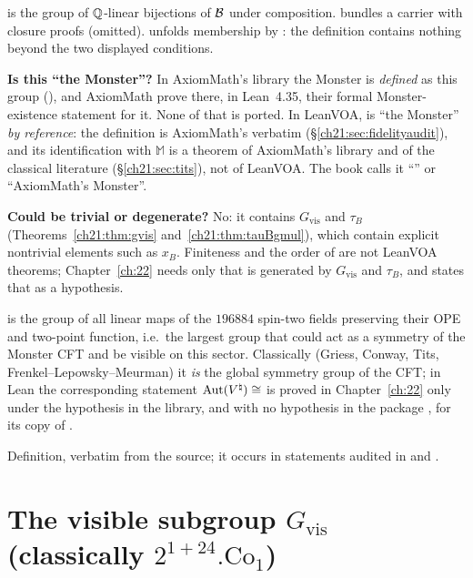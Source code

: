 \begin{dictionary}
 is the group of ${\mathbb{Q}}$-linear bijections of $\mathcal{B}$ under composition.
 bundles a carrier with closure proofs (omitted).   unfolds membership by
: the definition contains nothing beyond the two displayed conditions.

\textbf{Is this ``the Monster''?}  In AxiomMath's library the Monster is \emph{defined} as this group
(), and AxiomMath prove there, in Lean~4.35, their formal
Monster-existence statement for it.  None of that is ported.  In LeanVOA,  is ``the
Monster'' \emph{by reference}: the definition is AxiomMath's verbatim (\S\ref{ch21:sec:fidelityaudit}),
and its identification with $\mathbb M$ is a theorem of AxiomMath's library and of the classical
literature (\S\ref{ch21:sec:tits}), not of LeanVOA.  The book calls it ``'' or ``AxiomMath's
Monster''.

\textbf{Could  be trivial or degenerate?}  No: it contains $G_{\mathrm{vis}}$ and $\tau_B$
(Theorems~\ref{ch21:thm:gvis} and~\ref{ch21:thm:tauBgmul}), which contain explicit nontrivial elements such
as $x_B$.  Finiteness and the order of  are not LeanVOA theorems; Chapter~\ref{ch:22} needs only
that  is generated by $G_{\mathrm{vis}}$ and $\tau_B$, and states that as a hypothesis.
\end{dictionary}
\begin{physics}
 is the group of all linear maps of the $196884$ spin-two fields preserving their OPE and
two-point function, i.e.\ the largest group that could act as a symmetry of the Monster CFT and be visible
on this sector.  Classically (Griess, Conway, Tits, Frenkel--Lepowsky--Meurman) it \emph{is} the global
symmetry group of the CFT; in Lean the corresponding statement $\operatorname{Aut}({V^{\natural}})\cong$  is proved in
Chapter~\ref{ch:22} only under the hypothesis  in the library, and with no hypothesis in the package
, for its copy of .
\end{physics}
\begin{status}
Definition, verbatim from the source; it occurs in statements audited in
 and .
\end{status}

\section{The visible subgroup \texorpdfstring{$G_{\mathrm{vis}}$}{Gvis} (classically \texorpdfstring{$2^{1+24}.\mathrm{Co}_1$}{2\^{}(1+24).Co1})}\label{ch21:sec:gvis}

